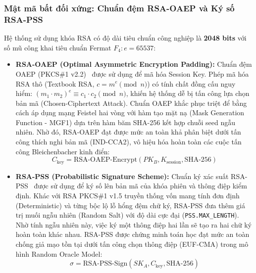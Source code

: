 \documentclass[a4paper,12pt]{article}
\begin{document}
\subsubsection{Mật mã bất đối xứng: Chuẩn đệm RSA-OAEP và Ký số RSA-PSS}
Hệ thống sử dụng khóa RSA có độ dài tiêu chuẩn công nghiệp là \textbf{2048 bits} với số mũ công khai tiêu chuẩn Fermat $F_4: e = 65537$:
\begin{itemize}
    \item \textbf{RSA-OAEP (Optimal Asymmetric Encryption Padding):} Chuẩn đệm OAEP (PKCS\#1 v2.2)~\cite{rfc8017} được sử dụng để mã hóa Session Key. Phép mã hóa RSA thô (Textbook RSA, $c = m^e \pmod n$) có tính chất đồng cấu nguy hiểm: $(m_1 \cdot m_2)^e \equiv c_1 \cdot c_2 \pmod n$, khiến hệ thống dễ bị tấn công lựa chọn bản mã (Chosen-Ciphertext Attack). Chuẩn OAEP khắc phục triệt để bằng cách áp dụng mạng Feistel hai vòng với hàm tạo mặt nạ (Mask Generation Function - MGF1) dựa trên hàm băm SHA-256 kết hợp chuỗi seed ngẫu nhiên. Nhờ đó, RSA-OAEP đạt được mức an toàn khả phân biệt dưới tấn công thích nghi bản mã (IND-CCA2), vô hiệu hóa hoàn toàn các cuộc tấn công Bleichenbacher kinh điển:
    \begin{equation}
        C_{\text{key}} = \text{RSA-OAEP-Encrypt}(PK_B, K_{\text{session}}, \text{SHA-256})
    \end{equation}
    \item \textbf{RSA-PSS (Probabilistic Signature Scheme):} Chuẩn ký xác suất RSA-PSS~\cite{rfc8017} được sử dụng để ký số lên bản mã của khóa phiên và thông điệp kiểm định. Khác với RSA PKCS\#1 v1.5 truyền thống vốn mang tính đơn định (Deterministic) và từng bộc lộ lỗ hổng đệm chữ ký, RSA-PSS đưa thêm giá trị muối ngẫu nhiên (Random Salt) với độ dài cực đại (\texttt{PSS.MAX\_LENGTH}). Nhờ tính ngẫu nhiên này, việc ký một thông điệp hai lần sẽ tạo ra hai chữ ký hoàn toàn khác nhau. RSA-PSS được chứng minh toán học đạt mức an toàn chống giả mạo tồn tại dưới tấn công chọn thông điệp (EUF-CMA) trong mô hình Random Oracle Model:
    \begin{equation}
        \sigma = \text{RSA-PSS-Sign}(SK_A, C_{\text{key}}, \text{SHA-256})
    \end{equation}
\end{itemize}
\end{document}
